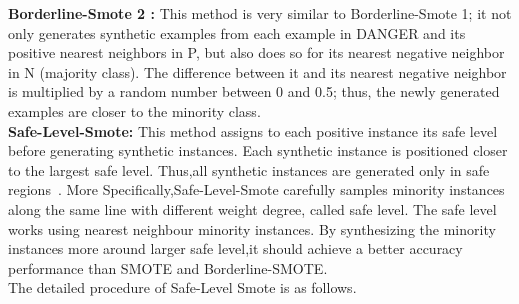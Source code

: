 \textbf{ Borderline-Smote 2 :}
 This method is very similar to Borderline-Smote 1; it not only generates synthetic examples from each example in DANGER and its positive nearest neighbors in P, but also does so for its nearest negative neighbor in N (majority class). The difference between it and its nearest negative neighbor is multiplied by a random number between 0 and 0.5; thus, the newly generated examples are closer to the minority class. \\

\textbf{Safe-Level-Smote:} This method assigns to each positive instance its safe level before generating synthetic instances. Each synthetic instance is positioned closer to the largest safe level. Thus,all synthetic instances are generated only in safe regions~\cite{Meidianingsih2017TheSO}.
More Specifically,Safe-Level-Smote carefully samples minority instances along the same line with different weight degree, called safe level. The safe level works using nearest neighbour minority instances. By synthesizing the minority instances more around larger safe level,it should achieve a better accuracy performance than SMOTE and Borderline-SMOTE. \\
The detailed procedure of Safe-Level Smote is as follows.\\

